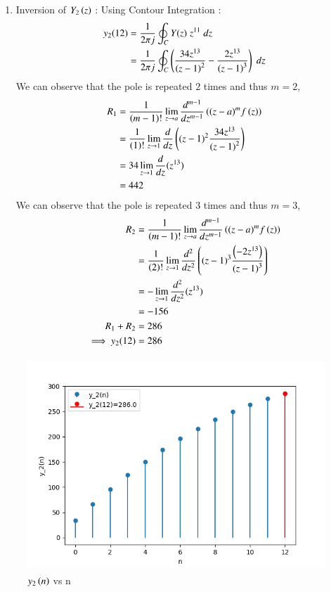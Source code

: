 \documentclass[journal,12pt,onecolumn]{IEEEtran}
\theoremstyle{remark}
\begin{document}
\begin{enumerate}[\brak{i}]
\begin{enumerate}[1.]
    \item
Inversion of $Y_2\left(z\right)$ :
 Using Contour Integration :
\begin{align}
    y_2{(12)}&=\frac{1}{2\pi j}\oint_{C}Y(z) \;z^{11} \;dz  \\
    &=\frac{1}{2\pi j}\oint_{C}\left(\frac{34z^{13}}{\left(z-1\right)^2}-
       \frac{2z^{13}}{\left(z-1\right)^3}\right) \;dz 
\end{align}
We can observe that the pole is repeated $2$ times and thus $m=2$,
\begin{align}
  R_1 &=\frac{1}{\left(m-1\right)!}\lim\limits_{z\to a}\frac{d^{m-1}}{dz^{m-1}}\left({(z-a)}^{m}f\left(z\right)\right)  \\
    &=\frac{1}{\left(1\right)!}\lim\limits_{z\to 1}\frac{d}{dz}\left({(z-1)}^{2}\frac{34z^{13}}{{(z-1)}^2}\right)   \\
    &=34\lim\limits_{z\to 1}\frac{d}{dz}(z^{13})   \\
    &= 442
    \end{align}
    We can observe that the pole is repeated $3$ times and thus $m=3$,
    \begin{align}
    R_2 &=\frac{1}{\left(m-1\right)!}\lim\limits_{z\to a}\frac{d^{m-1}}{dz^{m-1}}\left({(z-a)}^{m}f\left(z\right)\right)  \\
    &=\frac{1}{\left(2\right)!}\lim\limits_{z\to 1}\frac{d^{2}}{dz^{2}}\left({(z-1)}^{3}\frac{\left(-2z^{13}\right)}{{(z-1)}^3}\right)   \\
    &=-\lim\limits_{z\to 1}\frac{d^2}{dz^2}(z^{13})   \\
    &= -156\\
    R_1 + R_2 &= 286\\
    \implies  y_2{(12)} &= 286
\end{align}

\end{enumerate}



\begin{figure}[!ht]
\centering
  \graphicspath{ {figs/} }
\includegraphics[width=12cm, height=8cm]{graph_2}
\caption{$y_2\left(n\right)$ vs n }
\label{graph:ee25-g3}
\end{figure}


\end{enumerate}
\end{document}
